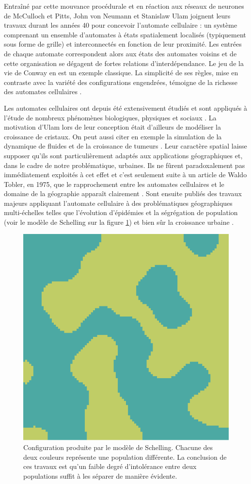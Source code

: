 \documentclass[10pt]{article}
\begin{document}
Entraîné par cette mouvance procédurale et en réaction aux réseaux de
neurones de McCulloch et Pitts, John von Neumann et Stanislaw Ulam
joignent leurs travaux durant les années 40 pour concevoir l'automate
cellulaire : un système comprenant un ensemble d'automates à états
spatialement localisés (typiquement sous forme de grille) et
interconnectés en fonction de leur proximité. Les entrées de chaque
automate correspondent alors aux états des automates voisins et de
cette organisation se dégagent de fortes relations
d'interdépendance. Le jeu de la vie de Conway en est un exemple
classique. La simplicité de ses règles, mise en contraste avec la
variété des configurations engendrées, témoigne de la richesse des
automates cellulaires \cite{Gardner1970}.

Les automates cellulaires ont depuis été extensivement étudiés et sont
appliqués à l'étude de nombreux phénomènes biologiques, physiques et
sociaux \cite{Ganguly2003}. La motivation d'Ulam lors de leur
conception était d'ailleurs de modéliser la croissance de cristaux. On
peut aussi citer en exemple la simulation de la dynamique de fluides
\cite{Frisch1986} et de la croissance de tumeurs
\cite{Kansal2000}. Leur caractère spatial laisse supposer qu'ils sont
particulièrement adaptés aux applications géographiques et, dans le
cadre de notre problématique, urbaines. Ils ne fûrent paradoxalement
pas immédiatement exploités à cet effet et c'est seulement suite à un
article de Waldo Tobler, en 1975, que le rapprochement entre les
automates cellulaires et le domaine de la géographie apparaît
clairement \cite{Tobler1975}. Sont ensuite publiés des travaux majeurs
appliquant l'automate cellulaire à des problématiques géographiques
multi-échelles telles que l'évolution d'épidémies \cite{Fu2003} et la
ségrégation de population \cite{Schelling1969} (voir le modèle de
Schelling sur la figure \ref{fig:schelling}) et bien sûr la croissance
urbaine \cite{Batty1997,Stevens2007}.

\begin{figure}[H]
  \centering
  \includegraphics[width=.5\linewidth]{images/schelling.png}
  \caption{Configuration produite par le modèle de Schelling. Chacune
    des deux couleurs représente une population différente. La
    conclusion de ces travaux est qu'un faible degré d'intolérance
    entre deux populations suffit à les séparer de manière évidente.}
  \label{fig:schelling}
\end{figure}
\end{document}
